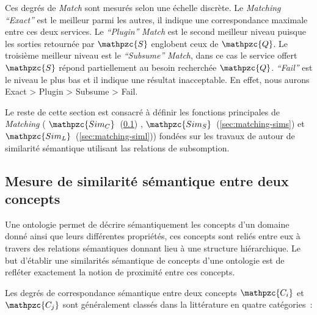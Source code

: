 Ces degrés de \emph{Match} sont mesurés selon une échelle discrète. Le
\emph{Matching} \emph{``Exact''} est le meilleur parmi les autres, il
indique une correspondance maximale entre ces deux services. Le
\emph{``Plugin''} \emph{Match} est le second meilleur niveau puisque
les sorties retournée par {\large $\mathpzc{S}$} englobent ceux de
{\large $\mathpzc{Q}$}. Le troisième meilleur niveau est le
\emph{``Subsume''} \emph{Match}, dans ce cas le service offert {\large
  $\mathpzc{S}$} répond partiellement au besoin recherchée {\large
  $\mathpzc{Q}$}. \emph{``Fail''} est le niveau le plus bas et il
indique une résultat inacceptable. En effet, nous aurons \textsf{Exact
  > Plugin > Subsume > Fail}.\medskip

Le reste de cette section est consacré à définir les fonctions
principales de \emph{Matching} ({\large
  $\mathpzc{Sim_C}$}~(\ref{sec:matching-simc}) , {\large
  $\mathpzc{Sim_S}$}~(\ref{sec:matching-sims}) et {\large
  $\mathpzc{Sim_L}$}~(\ref{sec:matching-siml})) fondées sur les
travaux de \cite{paolucci2003using, li2004software} autour de
similarité sémantique utilisant las relations de subsomption.\medskip

\subsection{Mesure de similarité sémantique entre deux concepts}
\label{sec:matching-simc}

Une ontologie permet de décrire sémantiquement les concepts d'un
domaine donné ainsi que leurs différentes propriétés, ces concepts
sont reliés entre eux à travers des relations sémantiques donnant lieu
à une structure hiérarchique. Le but d'établir une similarités
sémantique de concepts d'une ontologie est de refléter exactement la
notion de proximité entre ces concepts.\medskip


Les degrés de correspondance sémantique entre deux concepts
$\mathpzc{C_i}$ et $\mathpzc{C_j}$ sont généralement classés dans la
littérature en quatre catégories~\cite{paolucci2002semantic}:\medskip

